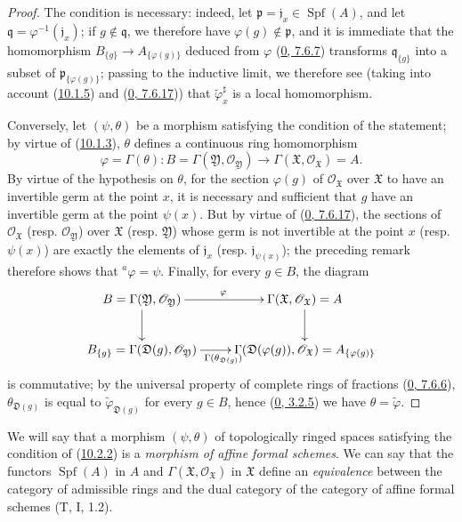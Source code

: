 \begin{proof}
The condition is necessary: indeed, let
$\mathfrak{p}=\mathfrak{j}_x\in\operatorname{Spf}(A)$, and let
$\mathfrak{q}=\varphi^{-1}(\mathfrak{j}_x)$; if
$g\notin\mathfrak{q}$, we therefore have $\varphi(g)\notin\mathfrak{p}$, and it
is immediate that the homomorphism
$B_{\{g\}}\to A_{\{\varphi(g)\}}$ deduced from $\varphi$
(\hyperref[0.7.6.7]{0, 7.6.7}) transforms
$\mathfrak{q}_{\{g\}}$ into a subset of
$\mathfrak{p}_{\{\varphi(g)\}}$; passing to the inductive limit, we
therefore see (taking into account (\hyperref[I.10.1.5]{10.1.5}) and
(\hyperref[0.7.6.17]{0, 7.6.17})) that
$\widetilde{\varphi}_x^\sharp$ is a local homomorphism.

Conversely, let $(\psi,\theta)$ be a morphism satisfying the condition of
the statement; by virtue of (\hyperref[I.10.1.3]{10.1.3}), $\theta$
defines a continuous ring homomorphism
\[
  \varphi=\Gamma(\theta):
  B=\Gamma(\mathfrak{Y},\mathscr{O}_{\mathfrak{Y}})
  \longrightarrow
  \Gamma(\mathfrak{X},\mathscr{O}_{\mathfrak{X}})=A.
\]
By virtue of the hypothesis on $\theta$, for the section $\varphi(g)$ of
$\mathscr{O}_{\mathfrak{X}}$ over $\mathfrak{X}$ to have an invertible
germ at the point $x$, it is necessary and sufficient that $g$ have an
invertible germ at the point $\psi(x)$. But by virtue of
(\hyperref[0.7.6.17]{0, 7.6.17}), the sections of
$\mathscr{O}_{\mathfrak{X}}$ (resp. $\mathscr{O}_{\mathfrak{Y}}$)
over $\mathfrak{X}$ (resp. $\mathfrak{Y}$) whose germ is not
invertible at the point $x$ (resp. $\psi(x)$) are exactly the elements of
$\mathfrak{j}_x$
(resp. $\mathfrak{j}_{\psi(x)}$); the preceding remark therefore shows that
${}^a\varphi=\psi$. Finally, for every $g\in B$, the diagram
\[
  \xymatrix{
    B=\Gamma(\mathfrak{Y},\mathscr{O}_{\mathfrak{Y}})
      \ar[r]^\varphi\ar[d] &
    \Gamma(\mathfrak{X},\mathscr{O}_{\mathfrak{X}})=A\ar[d]\\
    B_{\{g\}}=\Gamma(\mathfrak{D}(g),\mathscr{O}_{\mathfrak{Y}})
      \ar[r]_{\Gamma(\theta_{\mathfrak{D}(g)})} &
    \Gamma(\mathfrak{D}(\varphi(g)),\mathscr{O}_{\mathfrak{X}})
      =A_{\{\varphi(g)\}}
  }
\]
is commutative; by the universal property of complete rings of
fractions (\hyperref[0.7.6.6]{0, 7.6.6}),
$\theta_{\mathfrak{D}(g)}$ is equal to
$\widetilde{\varphi}_{\mathfrak{D}(g)}$ for every $g\in B$, hence
(\hyperref[0.3.2.5]{0, 3.2.5}) we have
$\theta=\widetilde{\varphi}$.
\end{proof}

We will say that a morphism $(\psi,\theta)$ of topologically ringed
spaces satisfying the condition of (\hyperref[I.10.2.2]{10.2.2}) is a
\emph{morphism of affine formal schemes}. We can say that the functors
$\operatorname{Spf}(A)$ in $A$ and
$\Gamma(\mathfrak{X},\mathscr{O}_{\mathfrak{X}})$ in $\mathfrak{X}$
define an \emph{equivalence} between the category of admissible rings
and the dual category of the category of affine formal schemes
(T, I, 1.2).

